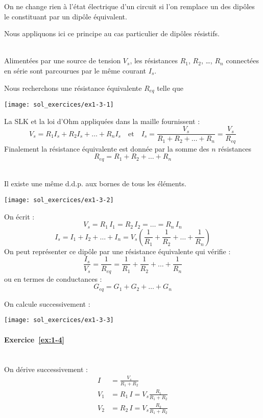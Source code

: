 On ne change rien à l'état électrique d'un circuit si l'on
remplace un des dipôles le constituant par un dipôle équivalent.

Nous appliquons ici ce principe au cas particulier de dipôles résistifs.

\\
Alimentées par une source de tension $V_s$, les résistances $R_1$,
$R_2$, \ldots , $R_n$ connectées en série sont parcourues par le même
courant $I_s$.
\newpage

Nous recherchons une résistance équivalente $R_{eq}$ telle que 
\begin{center}
\texttt{[image: sol\_exercices/ex1-3-1]}
\end{center}
La SLK et la loi d'Ohm appliquées dans la maille fournissent :
\[V_s=R_1I_s+R_2I_s+\ldots + R_nI_s\quad \text{et}\quad
I_s=\frac{V_s}{R_1+R_2+\ldots + R_n}=\frac{V_s}{R_{eq}}\]
Finalement la résistance équivalente est donnée par la somme des $n$
résistances
\[R_{eq}=R_1+R_2+\ldots +R_n\]

\\
Il existe une même d.d.p. aux bornes de tous les éléments.
\begin{center}
	\texttt{[image: sol\_exercices/ex1-3-2]}
\end{center}
On écrit :
\[V_s=R_1\, I_1 = R_2\, I_2 = \ldots = R_n\, I_n \]
\[I_s=I_1+I_2+ \ldots + I_n= V_s(\frac{1}{R_1}+\frac{1}{R_2}+ \ldots +
\frac{1}{R_n})\]
On peut représenter ce dipôle par une résistance équivalente qui vérifie :
\[\frac{I_s}{V_s}=\frac{1}{R_{eq}}=\frac{1}{R_1}+\frac{1}{R_2}+\ldots
+  \frac{1}{R_n}\]
ou en termes de conductances :
\[G_{eq}=G_1+G_2+ \ldots + G_n\]

\newpage
{}
On calcule successivement :
\begin{center}
	\texttt{[image: sol\_exercices/ex1-3-3]}
\end{center}

\paragraph{Exercice~\ref{ex:1-4}}~\\%
On dérive successivement :
\begin{align*}
I&=\frac{V_s}{R_1+R_2}\\
V_1&=R_1\,I=V_s\frac{R_1}{R_1+R_2}\\
V_2&=R_2\,I=V_s\frac{R_2}{R_1+R_2} 
\end{align*}

